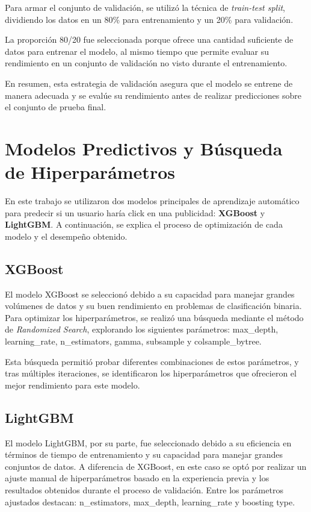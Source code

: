\documentclass[a4paper,11pt]{article}
\begin{document}
Para armar el conjunto de validación, se utilizó la técnica de \textit{train-test split}, dividiendo los datos en un 80\% para entrenamiento y un 20\% para validación.

La proporción 80/20 fue seleccionada porque ofrece una cantidad suficiente de datos para entrenar el modelo, al mismo tiempo que permite evaluar su rendimiento en un conjunto de validación no visto durante el entrenamiento.

En resumen, esta estrategia de validación asegura que el modelo se entrene de manera adecuada y se evalúe su rendimiento antes de realizar predicciones sobre el conjunto de prueba final.


\section{Modelos Predictivos y Búsqueda de Hiperparámetros}

En este trabajo se utilizaron dos modelos principales de aprendizaje automático para predecir si un usuario haría click en una publicidad: \textbf{XGBoost} y \textbf{LightGBM}. A continuación, se explica el proceso de optimización de cada modelo y el desempeño obtenido.

\subsection{XGBoost}

El modelo XGBoost se seleccionó debido a su capacidad para manejar grandes volúmenes de datos y su buen rendimiento en problemas de clasificación binaria. Para optimizar los hiperparámetros, se realizó una búsqueda mediante el método de \textit{Randomized Search}, explorando los siguientes parámetros: max_depth, learning_rate, n_estimators, gamma, subsample y colsample_bytree.

Esta búsqueda permitió probar diferentes combinaciones de estos parámetros, y tras múltiples iteraciones, se identificaron los hiperparámetros que ofrecieron el mejor rendimiento para este modelo.

\subsection{LightGBM}

El modelo LightGBM, por su parte, fue seleccionado debido a su eficiencia en términos de tiempo de entrenamiento y su capacidad para manejar grandes conjuntos de datos. A diferencia de XGBoost, en este caso se optó por realizar un ajuste manual de hiperparámetros basado en la experiencia previa y los resultados obtenidos durante el proceso de validación. Entre los parámetros ajustados destacan: n_estimators, max_depth, learning_rate y boosting type.
\end{document}
